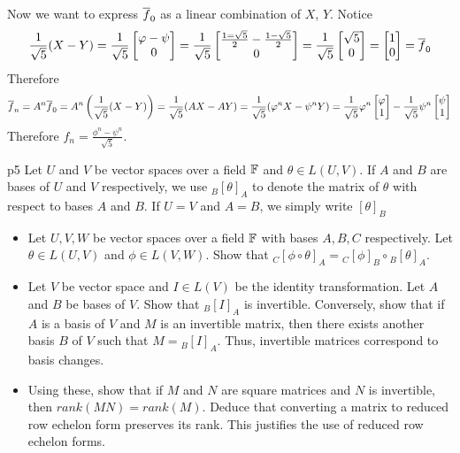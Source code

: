 \documentclass[a4paper, 11pt]{article}
\begin{document}
{\begin{itemize}[label=$\bullet$]
Now we want to express $\overline{f}_0$ as a linear combination of $X$, $Y$. Notice$$\frac1{\sqrt{5}}(X-Y)=\frac1{\sqrt{5}}\left[\begin{matrix}\varphi-\psi\\ 0\end{matrix}\right]=\frac{1}{\sqrt{5}}\left[\begin{matrix}\frac{1=\sqrt{5}}2-\frac{1-\sqrt{5}}2\\ 0\end{matrix}\right]=\frac1{\sqrt{5}}\left[\begin{matrix}\sqrt{5}\\ 0\end{matrix}\right]=\left[\begin{matrix}1\\ 0\end{matrix}\right]=\overline{f}_0$$Therefore $$\overline{f}_n=A^n\overline{f}_0=A^n\left(\frac1{\sqrt{5}}(X-Y)\right)=\frac1{\sqrt{5}}(AX-AY)=\frac1{\sqrt{5}}(\varphi^n X-\psi^n Y)=\frac1{\sqrt{5}}\varphi^n\left[\begin{matrix}\varphi\\ 1\end{matrix}\right]-\frac{1}{\sqrt{5}}\psi^n\left[\begin{matrix}\psi\\ 1\end{matrix}\right]$$Therefore $f_{n}=\frac{\phi^n-\psi^n}{\sqrt{5}}$.
\end{itemize}		
}


\begin{problem}{%
}{p5%
}
Let $U$ and $V$ be vector spaces over a field $\mathbb{F}$ and $\theta\in L(U,V)$. If $A$ and $B$ are bases of $U$ and $V$ respectively, we use $_B[\theta]_A$ to denote the matrix of $\theta$ with respect to bases $A$ and $B$. If $U=V$ and $A=B$, we simply write $[\theta]_B$\begin{itemize}[label=$\bullet$]
	\item Let $U,V,W$ be vector spaces over a field $\mathbb{F}$ with bases $A,B,C$ respectively. Let $\theta\in L(U,V)$ and $\phi\in L(V,W)$. Show that $_C[\phi\circ\theta]_A={}_C[\phi]_B\circ {}_B[\theta]_A$.
	\item Let $V$ be vector space and $I\in L(V)$ be the identity transformation. Let $A$ and $B$ be bases of $V$. Show that $_B[I]_A$ is invertible. Conversely, show that if $A$ is a basis of $V$ and $M$ is an invertible matrix, then there exists another basis $B$ of $V$ such that $M={}_B[I]_A$. Thus, invertible matrices correspond to basis changes.
	\item Using these, show that if $M$ and $N$ are square matrices and $N$ is invertible, then $rank(MN)=rank(M)$. Deduce that converting a matrix to reduced row echelon form preserves its rank. This justifies the use of reduced row echelon forms.
\end{itemize}
\end{problem}
\solve{
\begin{itemize}[label=$\bullet$]
	\item
\end{itemize}
}
\end{document}
